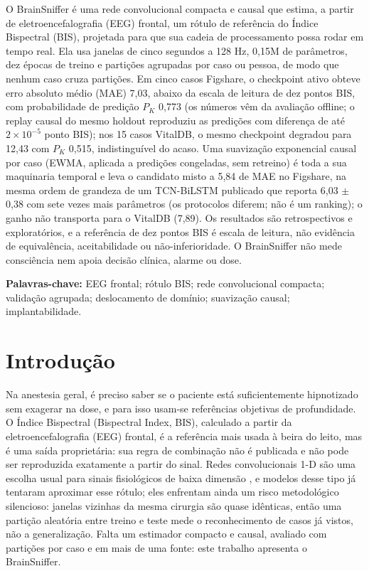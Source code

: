 \documentclass[12pt]{article}
\begin{document}
\begin{resumo}
O BrainSniffer é uma rede convolucional compacta e causal que estima, a partir de eletroencefalografia (EEG) frontal, um rótulo de referência do Índice Bispectral (BIS), projetada para que sua cadeia de processamento possa rodar em tempo real. Ela usa janelas de cinco segundos a 128 Hz, 0,15M de parâmetros, dez épocas de treino e partições agrupadas por caso ou pessoa, de modo que nenhum caso cruza partições. Em cinco casos Figshare, o checkpoint ativo obteve erro absoluto médio (MAE) 7,03, abaixo da escala de leitura de dez pontos BIS, com probabilidade de predição $P_K$ 0,773 (os números vêm da avaliação offline; o replay causal do mesmo holdout reproduziu as predições com diferença de até $2\times10^{-5}$ ponto BIS); nos 15 casos VitalDB, o mesmo checkpoint degradou para 12,43 com $P_K$ 0,515, indistinguível do acaso. Uma suavização exponencial causal por caso (EWMA, aplicada a predições congeladas, sem retreino) é toda a sua maquinaria temporal e leva o candidato misto a 5,84 de MAE no Figshare, na mesma ordem de grandeza de um TCN-BiLSTM publicado que reporta 6,03 $\pm$ 0,38 com sete vezes mais parâmetros (os protocolos diferem; não é um ranking); o ganho não transporta para o VitalDB (7,89). Os resultados são retrospectivos e exploratórios, e a referência de dez pontos BIS é escala de leitura, não evidência de equivalência, aceitabilidade ou não-inferioridade. O BrainSniffer não mede consciência nem apoia decisão clínica, alarme ou dose.

\textbf{Palavras-chave:} EEG frontal; rótulo BIS; rede convolucional compacta; validação agrupada; deslocamento de domínio; suavização causal; implantabilidade.
\end{resumo}

\section{Introdução}

Na anestesia geral, é preciso saber se o paciente está suficientemente hipnotizado sem exagerar na dose, e para isso usam-se referências objetivas de profundidade. O Índice Bispectral (Bispectral Index, BIS), calculado a partir da eletroencefalografia (EEG) frontal, é a referência mais usada à beira do leito, mas é uma saída proprietária: sua regra de combinação não é publicada e não pode ser reproduzida exatamente a partir do sinal. Redes convolucionais 1-D são uma escolha usual para sinais fisiológicos de baixa dimensão \cite{kiranyaz2021,craik2019}, e modelos desse tipo já tentaram aproximar esse rótulo; eles enfrentam ainda um risco metodológico silencioso: janelas vizinhas da mesma cirurgia são quase idênticas, então uma partição aleatória entre treino e teste mede o reconhecimento de casos já vistos, não a generalização. Falta um estimador compacto e causal, avaliado com partições por caso e em mais de uma fonte: este trabalho apresenta o BrainSniffer.
\end{document}
